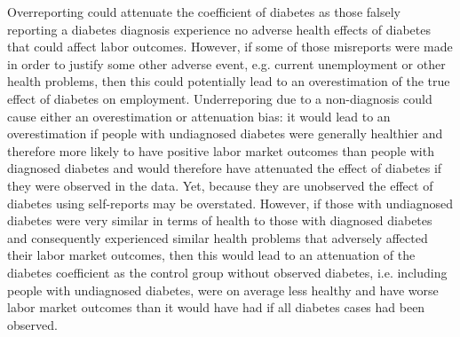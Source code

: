 \documentclass[12pt,english,british]{article}
\begin{document}
Overreporting could attenuate the coefficient of diabetes as those falsely reporting a diabetes diagnosis experience no adverse health
effects of diabetes that could affect labor outcomes. However, if some of those misreports were
made in order to justify some other adverse event, e.g. current unemployment
or other health problems, then this could potentially lead to an overestimation
of the true effect of diabetes on employment. Underreporing due to
a non-diagnosis could cause either an overestimation or attenuation
bias: it would lead to an overestimation if people with undiagnosed
diabetes were generally healthier and therefore more likely to have
positive labor market outcomes than people with diagnosed diabetes
and would therefore have attenuated the effect of diabetes if they
were observed in the data. Yet, because they are unobserved the effect
of diabetes using self-reports may be overstated. However, if those
with undiagnosed diabetes were very similar in terms of health to those with
diagnosed diabetes and consequently experienced similar health problems
that adversely affected their labor market outcomes, then this would lead to an attenuation of the diabetes coefficient as the control group without observed diabetes, i.e. including people with undiagnosed
diabetes, were on average less healthy and have worse labor market outcomes than it
would have had if all diabetes cases had been observed.
\end{document}
